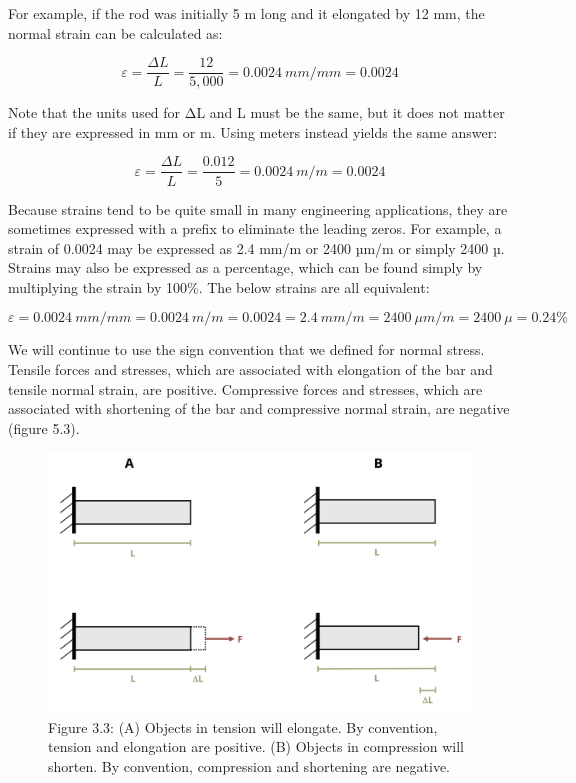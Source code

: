 \documentclass[
  letterpaper,
  DIV=11,
  numbers=noendperiod]{scrreprt}
\begin{document}
For example, if the rod was initially 5 m long and it elongated by 12
mm, the normal strain can be calculated as:

\[
\varepsilon=\frac{\Delta L}{L}=\frac{12}{5,000}=0.0024{~mm} /{mm}=0.0024
\]

Note that the units used for ΔL and L must be the same, but it does not
matter if they are expressed in mm or m. Using meters instead yields the
same answer:

\[
\varepsilon=\frac{\Delta L}{L}=\frac{0.012}{5}=0.0024{~m}/{m}=0.0024
\]

Because strains tend to be quite small in many engineering applications,
they are sometimes expressed with a prefix to eliminate the leading
zeros. For example, a strain of 0.0024 may be expressed as 2.4 mm/m or
2400 µm/m or simply 2400 µ. Strains may also be expressed as a
percentage, which can be found simply by multiplying the strain by
100\%. The below strains are all equivalent:

\[
\varepsilon=0.0024{~mm}/{mm}=0.0024{~m}/{m}=0.0024=2.4{~mm}/{m}=2400~\mu{m}/{m}=2400 ~\mu=0.24\%
\]

We will continue to use the sign convention that we defined for normal
stress. Tensile forces and stresses, which are associated with
elongation of the bar and tensile normal strain, are positive.
Compressive forces and stresses, which are associated with shortening of
the bar and compressive normal strain, are negative (figure 5.3).

\begin{figure}[H]

{\centering \includegraphics{images/CH3 PNGs/figure 3.3.png}

}

\caption{Figure 3.3: (A) Objects in tension will elongate. By
convention, tension and elongation are positive. (B) Objects in
compression will shorten. By convention, compression and shortening are
negative.}

\end{figure}%
\end{document}
